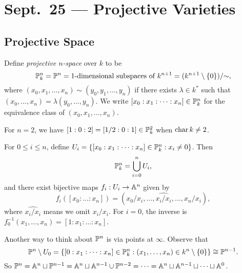 \chapter{Sept.~25 --- Projective Varieties}

\section{Projective Space}

\begin{definition}
  Define \emph{projective $n$-space} over
  $k$ to be
  \[
    \mathbb{P}^n_k = \mathbb{P}^n
    = \text{1-dimensional subspaces of $k^{n + 1}$}
    = (k^{n + 1} \setminus \{0\}) / {\sim},
  \]
  where $(x_0, x_1, \dots, x_n) \sim (y_0, y_1, \dots, y_n)$
  if there exists $\lambda \in k^*$
  such that
  $(x_0, \dots, x_n) = \lambda (y_0, \dots, y_n)$.
  We write $[x_0 : x_1 : \dots : x_n] \in \mathbb{P}^n_k$
  for the equivalence class of
  $(x_0, x_1, \dots, x_n)$.
\end{definition}

\begin{example}
  For $n = 2$, we have
  $[1 : 0 : 2] = [1 / 2 : 0 : 1] \in \mathbb{P}^2_k$
  when $\operatorname{char} k \ne 2$.
\end{example}

\begin{remark}
  For $0 \le i \le n$, define
  $U_i = \{[x_0 : x_1 : \dots : x_n] \in \mathbb{P}^n_k : x_i \ne 0\}$.
  Then
  \[
    \mathbb{P}^n_k = \bigcup_{i = 0}^n U_i,
  \]
  and there exist bijective maps
  $f_i : U_i \to \mathbb{A}^n$ given by
  \[
    f_i([x_0 : \dots : x_n])
    = (x_0 / x_i, \dots, \widehat{x_i / x_i}, \dots, x_n / x_i),
  \]
  where $\widehat{x_i / x_i}$ means we omit
  $x_i / x_i$.
  For $i = 0$, the inverse is
  $f_0^{-1}(x_1, \dots, x_n) = [1 : x_1 : \dots : x_n]$.
\end{remark}

\begin{remark}
  Another way to think about $\mathbb{P}^n$ is
  via points at $\infty$. Observe that
  \[
    \mathbb{P}^n \setminus U_0
    = \{[0 : x_1 : \dots : x_n] \in \mathbb{P}^n_k : (x_1, \dots, x_n) \in k^n \setminus \{0\}\}
    \cong \mathbb{P}^{n - 1}.
  \]
  So $\mathbb{P}^n = \mathbb{A}^n \sqcup \mathbb{P}^{n - 1} = \mathbb{A}^n \sqcup \mathbb{A}^{n - 1} \cup \mathbb{P}^{n - 2} = \dots = \mathbb{A}^n \sqcup \mathbb{A}^{n - 1} \sqcup \dots \sqcup \mathbb{A}^0$.
\end{remark}

